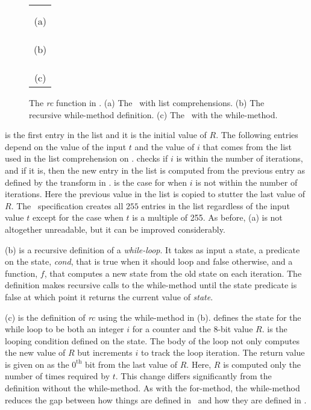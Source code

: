 \begin{figure}[t]
  \begin{center}
    \begin{tabular}{l}
      \usebox{\RcCry} \\ \\
      \multicolumn{1}{c}{(a)} \\ \\
      \usebox{\whilemethod} \\ \\
      \multicolumn{1}{c}{(b)} \\ \\ 
      \usebox{\RcCryLib} \\ \\
      \multicolumn{1}{c}{(c)}
    \end{tabular}
  \end{center}
  \caption{The \emph{rc} function in \cryptol. (a) The \cryptol\ with list comprehensions. (b) The recursive while-method definition. (c) The \cryptol\ with the while-method.}
  \label{fig:rccry}
\end{figure}

 is the first entry in the list and it is the initial value of $R$.
The following entries depend on the value of the input $t$ and the value of $i$ that comes from the list used in the list comprehension on .
 checks if $i$ is within the number of iterations, and if it is, then the new entry in the list is computed from the previous entry as defined by the transform in .
 is the case for when $i$ is not within the number of iterations.
Here the previous value in the list is copied to stutter the last value of $R$. 
The \cryptol\ specification creates all $255$ entries in the list regardless of the input value $t$ except for the case when $t$ is a multiple of 255.
As before, (a) is not altogether unreadable, but it can be improved considerably.

(b) is a recursive definition of a \emph{while-loop}.
It takes as input a state, a predicate on the state, \emph{cond}, that is true when it should loop and false otherwise, and a function, $f$, that computes a new state from the old state on each iteration.
The definition makes recursive calls to the while-method until the state predicate is false at which point it returns the current value of \emph{state}.

(c) is the definition of \emph{rc} using the while-method in (b).
 defines the state for the while loop to be both an integer $i$ for a counter and the 8-bit value $R$.
 is the looping condition defined on the state.
The body of the loop not only computes the new value of $R$ but  increments $i$ to track the loop iteration.
The return value is given on  as the $0^\mathrm{th}$ bit from the last value of $R$.
Here, $R$ is computed only the number of times required by $t$.
This change differs significantly from the definition without the while-method.
As with the for-method, the while-method reduces the gap between how things are defined in \fips\ and how they are defined in \cryptol.
